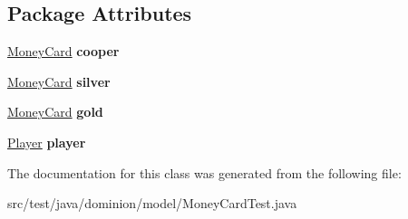 \subsection*{\-Package \-Attributes}
\begin{DoxyCompactItemize}
\item 
\hypertarget{classdominion_1_1model_1_1MoneyCardTest_ae34b8651e8f3212e9a176a34f909989e}{\hyperlink{interfacedominion_1_1model_1_1cards_1_1MoneyCard_1_1MoneyCard}{\-Money\-Card} {\bfseries cooper}}\label{classdominion_1_1model_1_1MoneyCardTest_ae34b8651e8f3212e9a176a34f909989e}

\item 
\hypertarget{classdominion_1_1model_1_1MoneyCardTest_ad9a52b5f5ce423c564e5e47b59502534}{\hyperlink{interfacedominion_1_1model_1_1cards_1_1MoneyCard_1_1MoneyCard}{\-Money\-Card} {\bfseries silver}}\label{classdominion_1_1model_1_1MoneyCardTest_ad9a52b5f5ce423c564e5e47b59502534}

\item 
\hypertarget{classdominion_1_1model_1_1MoneyCardTest_a260e47305f52217760756d58cbcb5b70}{\hyperlink{interfacedominion_1_1model_1_1cards_1_1MoneyCard_1_1MoneyCard}{\-Money\-Card} {\bfseries gold}}\label{classdominion_1_1model_1_1MoneyCardTest_a260e47305f52217760756d58cbcb5b70}

\item 
\hypertarget{classdominion_1_1model_1_1MoneyCardTest_a85a9a33cc9de9a719af30168346b4e0a}{\hyperlink{interfacedominion_1_1model_1_1Player}{\-Player} {\bfseries player}}\label{classdominion_1_1model_1_1MoneyCardTest_a85a9a33cc9de9a719af30168346b4e0a}

\end{DoxyCompactItemize}


\-The documentation for this class was generated from the following file\-:\begin{DoxyCompactItemize}
\item 
src/test/java/dominion/model/\-Money\-Card\-Test.\-java\end{DoxyCompactItemize}
